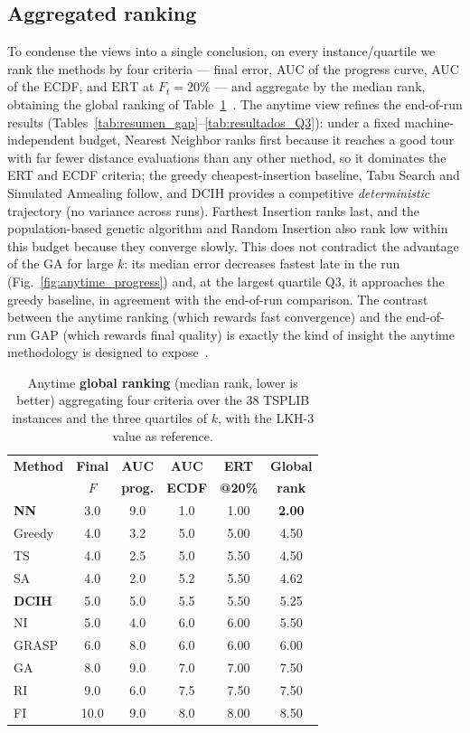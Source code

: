 \documentclass[conference]{IEEEtran}
\begin{document}
\subsection{Aggregated ranking}
To condense the views into a single conclusion, on every instance/quartile we rank
the methods by four criteria --- final error, AUC of the progress curve, AUC of the
ECDF, and $\mathrm{ERT}$ at $F_t=20\%$ --- and aggregate by the median rank,
obtaining the global ranking of Table~\ref{tab:anytime_ranking}~\cite{weise2014benchmarking}.
The anytime view refines the end-of-run results
(Tables~\ref{tab:resumen_gap}--\ref{tab:resultados_Q3}): under a fixed
machine-independent budget, Nearest Neighbor ranks first because it reaches a good
tour with far fewer distance evaluations than any other method, so it dominates the
ERT and ECDF criteria; the greedy cheapest-insertion baseline, Tabu Search and Simulated
Annealing follow, and DCIH provides a competitive \emph{deterministic} trajectory
(no variance across runs). Farthest Insertion ranks last, and the population-based
genetic algorithm and Random Insertion also rank low within this budget because they converge slowly.
This does not contradict the advantage of the GA for large $k$: its median error
decreases fastest late in the run (Fig.~\ref{fig:anytime_progress}) and, at the
largest quartile Q3, it approaches the greedy baseline, in agreement with the
end-of-run comparison. The contrast between the anytime ranking (which rewards fast
convergence) and the end-of-run GAP (which rewards final quality) is exactly the
kind of insight the anytime methodology is designed to expose~\cite{weise2014benchmarking}.

\begin{table}[htbp]
\centering
\caption{Anytime \textbf{global ranking} (median rank, lower is better) aggregating four criteria over the 38 TSPLIB instances and the three quartiles of $k$, with the LKH-3 value as reference.}
\label{tab:anytime_ranking}
\begin{tabular}{|l|c|c|c|c|c|}
\hline
\textbf{Method} & \textbf{Final} & \textbf{AUC} & \textbf{AUC} & \textbf{ERT} & \textbf{Global} \\
                & \textbf{$F$}   & \textbf{prog.}& \textbf{ECDF}& \textbf{@20\%}& \textbf{rank} \\
\hline
\textbf{NN} & 3.0 & 9.0 & 1.0 & 1.00 & \textbf{2.00} \\
Greedy & 4.0 & 3.2 & 5.0 & 5.00 & 4.50 \\
TS & 4.0 & 2.5 & 5.0 & 5.50 & 4.50 \\
SA & 4.0 & 2.0 & 5.2 & 5.50 & 4.62 \\
\textbf{DCIH} & 5.0 & 5.0 & 5.5 & 5.50 & 5.25 \\
NI & 5.0 & 4.0 & 6.0 & 6.00 & 5.50 \\
GRASP & 6.0 & 8.0 & 6.0 & 6.00 & 6.00 \\
GA & 8.0 & 9.0 & 7.0 & 7.00 & 7.50 \\
RI & 9.0 & 6.0 & 7.5 & 7.50 & 7.50 \\
FI & 10.0 & 9.0 & 8.0 & 8.00 & 8.50 \\
\hline
\end{tabular}
\end{table}
\end{document}
